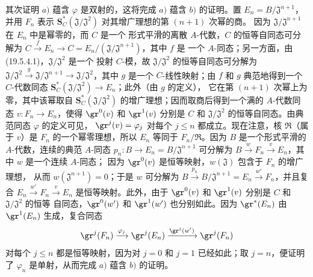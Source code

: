 \begin{env}[19.5.4.2]
\label{0.19.5.4.2-fr}
其次证明 $a)$ 蕴含 $\varphi$ 是双射的，这将完成 $a)$ 蕴含 $b)$ 的证明。置
$E_n=B/\mathfrak J^{n+1}$，并用 $F_n$ 表示
$\mathbf S_C^*(\mathfrak J/\mathfrak J^2)$ 对其增广理想的第 $(n+1)$ 次幂的商。
因为 $\mathfrak J/\mathfrak J^{n+1}$ 在 $E_n$ 中是幂零的，而 $C$ 是一个
形式平滑的离散 $A$-代数，$C$ 的恒等自同态可分解为
$C\xrightarrow{f}E_n\to C=E_n/(\mathfrak J/\mathfrak J^{n+1})$，其中 $f$ 是
一个 $A$-同态；另一方面，由 (19.5.4.1)，$\mathfrak J/\mathfrak J^2$ 是一个
投射 $C$-模，故 $\mathfrak J/\mathfrak J^2$ 的恒等自同态可分解为
$\mathfrak J/\mathfrak J^2\xrightarrow{g}\mathfrak J/\mathfrak J^{n+1}
\to\mathfrak J/\mathfrak J^2$，其中 $g$ 是一个 $C$-线性映射；由 $f$ 和 $g$
典范地得到一个 $C$-代数同态
$\mathbf S_C^*(\mathfrak J/\mathfrak J^2)\to E_n$；此外（由 $g$ 的定义），
它在第 $(n+1)$ 次幂上为零，其中该幂取自
$\mathbf S_C^*(\mathfrak J/\mathfrak J^2)$ 的增广理想；因而取商后得到一个满的
$A$-代数同态
$v:F_n\to E_n$，使得 $\gr^0(v)$ 和 $\gr^1(v)$ 分别是 $C$ 和
$\mathfrak J/\mathfrak J^2$ 的恒等自同态。由典范同态 $\varphi$ 的定义可见，
$\gr^j(v)=\varphi_j$ 对每个 $j\leq n$ 都成立。现在注意，核
$\mathfrak R$（属于 $v$）是 $F_n$ 的一个幂零理想，所以 $E_n$ 等同于
$F_n/\mathfrak R$。因为 $B$ 是一个形式平滑的 $A$-代数，连续的典范
$A$-同态 $p_n:B\to E_n=B/\mathfrak J^{n+1}$ 可分解为
$B\xrightarrow{w}F_n\xrightarrow{v}E_n$，其中 $w$ 是一个连续 $A$-同态；
因为 $\gr^0(v)$ 是恒等映射，$w(\mathfrak J)$ 包含于 $F_n$ 的增广理想，
从而 $w(\mathfrak J^{n+1})=0$；于是 $w$ 可分解为
$B\xrightarrow{p_n}B/\mathfrak J^{n+1}=E_n\xrightarrow{w'}F_n$，并且复合
$E_n\xrightarrow{w'}F_n\xrightarrow{v}E_n$ 是恒等映射。此外，由于
$\gr^0(v)$ 和 $\gr^1(v)$ 分别是 $C$ 和 $\mathfrak J/\mathfrak J^2$ 的恒等
自同态，$\gr^0(w')$ 和 $\gr^1(w')$ 也分别如此。因为 $\gr^*(E_n)$ 由
$\gr^1(E_n)$ 生成，复合同态
\[
  \gr^j(F_n)\xrightarrow{\varphi_j}\gr^j(E_n)
  \xrightarrow{\gr^j(w')}\gr^j(F_n)
\]
对每个 $j\leq n$ 都是恒等映射，因为对 $j=0$ 和 $j=1$ 已经如此；取
$j=n$，便证明了 $\varphi_n$ 是单射，从而完成 $a)$ 蕴含 $b)$ 的证明。
\end{env}

